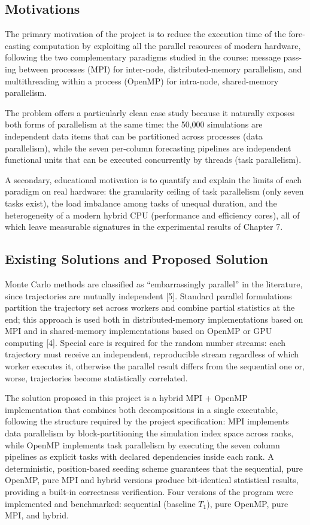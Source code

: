 \documentclass[12pt,a4paper]{article}
\begin{document}
\subsection{Motivations}

The primary motivation of the project is to reduce the execution time of
the fore-casting computation by exploiting all the parallel resources of
modern hardware, following the two complementary paradigms studied in
the course: message pass-ing between processes (MPI) for inter-node,
distributed-memory parallelism, and multithreading within a process
(OpenMP) for intra-node, shared-memory parallelism.

The problem offers a particularly clean case study because it
naturally exposes both forms of parallelism at the same time: the 50,000
simulations are independent data items that can be partitioned across
processes (data parallelism), while the seven per-column forecasting
pipelines are independent functional units that can be executed
concurrently by threads (task parallelism).

A secondary, educational motivation is to quantify and explain the
limits of each paradigm on real hardware: the granularity ceiling of
task parallelism (only seven tasks exist), the load imbalance among
tasks of unequal duration, and the heterogeneity of a modern hybrid CPU
(performance and efficiency cores), all of which leave measurable
signatures in the experimental results of Chapter 7.

\subsection{Existing Solutions and Proposed Solution}

Monte Carlo methods are classified as ``embarrassingly parallel'' in the
literature, since trajectories are mutually independent [5].
Standard parallel formulations partition the trajectory set across
workers and combine partial statistics at the end; this approach is used
both in distributed-memory implementations based on MPI and in
shared-memory implementations based on OpenMP or GPU computing [4].
Special care is required for the random number streams: each trajectory
must receive an independent, reproducible stream regardless of which
worker executes it, otherwise the parallel result differs from the
sequential one or, worse, trajectories become statistically correlated.

The solution proposed in this project is a hybrid MPI + OpenMP
implementation that combines both decompositions in a single executable,
following the structure required by the project specification: MPI
implements data parallelism by block-partitioning the simulation index
space across ranks, while OpenMP implements task parallelism by
executing the seven column pipelines as explicit tasks with declared
dependencies inside each rank. A deterministic, position-based seeding
scheme guarantees that the sequential, pure OpenMP, pure MPI and hybrid
versions produce bit-identical statistical results, providing a built-in
correctness verification. Four versions of the program were implemented
and benchmarked: sequential (baseline $T_1$), pure OpenMP, pure MPI, and hybrid.
\end{document}
